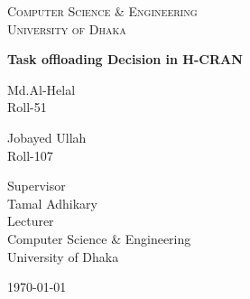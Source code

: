 \documentclass[12pt,a4paper]{report}
\begin{document}
\begin{titlepage}
\centering
{\scshape\LARGE Computer Science \& Engineering\\University of Dhaka \par}
\vspace{1.5cm}
{\huge\bfseries Task offloading Decision in H-CRAN\par}
\vspace{3cm}
\vspace{0.5cm}
{\Large \parbox{5cm}{\centering Md.Al-Helal\\Roll-51}\hspace{1cm}\parbox{6cm}{\centering Jobayed Ullah\\Roll-107}}
\vfill
{\Large Supervisor\\
\vspace{0.5cm}
Tamal Adhikary \\ Lecturer\\Computer Science \& Engineering\\University of Dhaka}
\vfill
{\large \today\par}
\end{titlepage}
\end{document}

